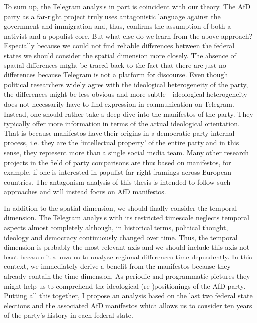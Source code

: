 \documentclass[a4paper]{scrreprt}
\begin{document}
To sum up, the Telegram analysis in part is coincident with our theory. The AfD party as a far-right project truly uses antagonistic language against the government and immigration and, thus, confirms the assumption of both a nativist and a populist core. But what else do we learn from the above approach? Especially because we could not find reliable differences between the federal states we should consider the spatial dimension more closely. The absence of spatial differences might be traced back to the fact that there are just no differences because Telegram is not a platform for discourse. Even though political researchers widely agree with the ideological heterogeneity of the party, the differences might be less obvious and more subtle - ideological heterogeneity does not necessarily have to find expression in communication on Telegram. Instead, one should rather take a deep dive into the manifestos of the party. They typically offer more information in terms of the actual ideological orientation. \cite[p.~7]{pfahl:2019} That is because manifestos have their origins in a democratic party-internal process, i.e. they are the `intellectual property' of the entire party and in this sense, they represent more than a single social media team. Many other research projects in the field of party comparisons are thus based on manifestos, for example, if one is interested in populist far-right framings across European countries. \citep{kranert:2019} The antagonism analysis of this thesis is intended to follow such approaches and will instead focus on AfD manifestos.\par
In addition to the spatial dimension, we should finally consider the temporal dimension. The Telegram analysis with its restricted timescale neglects temporal aspects almost completely although, in historical terms, political thought, ideology and democracy continuously changed over time. Thus, the temporal dimension is probably the most relevant axis and we should include this axis not least because it allows us to analyze regional differences time-dependently. In this context, we immediately derive a benefit from the manifestos because they already contain the time dimension. As periodic and programmatic pictures they might help us to comprehend the ideological (re-)positionings of the AfD party. Putting all this together, I propose an analysis based on the last two federal state elections and the associated AfD manifestos which allows us to consider ten years of the party's history in each federal state.
\end{document}
